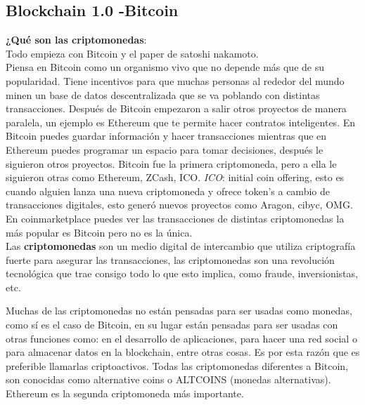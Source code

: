 \documentclass[a4paper,12pt]{lib/pub}
\begin{document}
\subsection{Blockchain 1.0 -Bitcoin}
\textbf{¿Qué son las criptomonedas}:\\
Todo empieza con Bitcoin y el paper de satoshi nakamoto.\\
Piensa en Bitcoin como un organismo vivo que no depende más que de su popularidad. Tiene incentivos para que muchas personas al rededor del mundo minen un base de datos descentralizada que se va poblando con distintas transacciones.
Después de Bitcoin empezaron a salir otros proyectos de manera paralela, un ejemplo es Ethereum que te permite hacer contratos inteligentes.
En Bitcoin puedes guardar información y hacer transacciones mientras que en Ethereum puedes programar un espacio para tomar decisiones, después le siguieron otros proyectos.
Bitcoin fue la primera criptomoneda, pero a ella le siguieron otras como Ethereum, ZCash, ICO.
\textit{ICO}: initial coin offering, esto es cuando alguien lanza una nueva criptomoneda y ofrece token's a cambio de transacciones digitales, esto generó nuevos proyectos como Aragon, cibyc, OMG.
En coinmarketplace puedes ver las transacciones de distintas criptomonedas la más popular es Bitcoin pero no es la única.\\

Las \textbf{criptomonedas} son un medio digital de intercambio que utiliza criptografía fuerte para asegurar las transacciones, 
las criptomonedas son una revolución tecnológica que trae consigo todo lo que esto implica, como fraude, inversionistas, etc.

Muchas de las criptomonedas no están pensadas para ser usadas como monedas, como sí es el caso de Bitcoin, en su lugar están pensadas para ser usadas con otras funciones como: en el desarrollo de aplicaciones, para hacer una red social o para almacenar datos en la blockchain, entre otras cosas. Es por esta razón que es preferible llamarlas criptoactivos.
Todas las criptomonedas diferentes a Bitcoin, son conocidas como alternative coins o ALTCOINS (monedas alternativas).\\
Ethereum es la segunda criptomoneda más importante.
\end{document}
